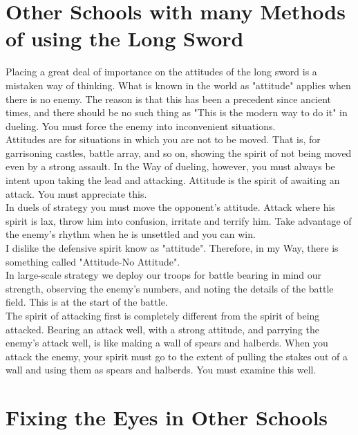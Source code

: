 \section{Other Schools with many Methods of using the Long Sword}

Placing a great deal of importance on the attitudes of the long sword is a mistaken way of thinking. What is known in the world as "attitude" applies when there is no enemy. The reason is that this has been a precedent since ancient times, and there should be no such thing as "This is the modern way to do it" in dueling. You must force the enemy into inconvenient situations.\\

Attitudes are for situations in which you are not to be moved. That is, for garrisoning castles, battle array, and so on, showing the spirit of not being moved even by a strong assault. In the Way of dueling, however, you must always be intent upon taking the lead and attacking. Attitude is the spirit of awaiting an attack. You must appreciate this.\\

In duels of strategy you must move the opponent's attitude. Attack where his spirit is lax, throw him into confusion, irritate and terrify him. Take advantage of the enemy's rhythm when he is unsettled and you can win.\\

I dislike the defensive spirit know as "attitude". Therefore, in my Way, there is something called "Attitude-No Attitude".\\

In large-scale strategy we deploy our troops for battle bearing in mind our strength, observing the enemy's numbers, and noting the details of the battle field. This is at the start of the battle.\\

The spirit of attacking first is completely different from the spirit of being attacked. Bearing an attack well, with a strong attitude, and parrying the enemy's attack well, is like making a wall of spears and halberds. When you attack the enemy, your spirit must go to the extent of pulling the stakes out of a wall and using them as spears and halberds. You must examine this well.\\
\section{Fixing the Eyes in Other Schools}

